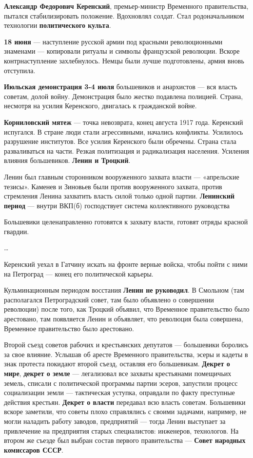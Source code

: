 \documentclass{article}
\begin{document}
\textbf{Александр Федорович Керенский}, премьер-министр Временного правительства, пытался стабилизировать положение. Вдохновлял солдат. Стал родоначальником технологии \textbf{политического культа}.

\textbf{18 июня} — наступление русской армии под красными революционными знаменами — копировали ритуалы и символы французской революции. Вскоре контрнаступление захлебнулось. Немцы были лучше подготовлены, армия вновь отступила.

\textbf{Июльская демонстрация 3-4 июля} большевиков и анархистов — вся власть советам, долой войну. Демонстрация было жестко подавлена полицией. Страна, несмотря на усилия Керенского, двигалась к гражданской войне.

\textbf{Корниловский мятеж} — точка невозврата, конец августа 1917 года. Керенский испугался. В стране люди стали агрессивными, начались конфликты. Усилилось разрушение институтов. Все усилия Керенского были обречены. Страна стала разваливаться на части. Резкая политизация и радикализация населения. Усиления влияния большевиков. \textbf{Ленин и Троцкий}.

Ленин был главным сторонником вооруженного захвата власти — «апрельские тезисы». Каменев и Зиновьев были против вооруженного захвата, против стремления Ленина захватить власть силой только одной партии. \textbf{Ленинский период} — внутри ВКП(б) господствует система коллективного руководства

Большевики целенаправленно готовятся к захвату власти, готовят отряды красной гвардии.

\hfill

\dots

Керенский уехал в Гатчину искать на фронте верные войска, чтобы пойти с ними на Петроград — конец его политической карьеры.

Кульминационным периодом восстания \textbf{Ленин не руководил}. В Смольном (там располагался Петроградский совет, там было объявлено о совершении революции) после того, как Троцкий объявил, что Временное правительство было арестовано, там появляется Ленин и объявляет, что революция была совершена, Временное правительство было арестовано.

Второй съезд советов рабочих и крестьянских депутатов — большевики боролись за свое влияние. Услышав об аресте Временного правительства, эсеры и кадеты в знак протеста покидают второй съезд, оставляя его большевикам. \textbf{Декрет о мире}, \textbf{декрет о земле} — легализовал все захваты крестьянами помещичьих земель, списали с политической программы партии эсеров, запустили процесс социализации земли — тактическая уступка, оправдали по факту преступные действия крестьян. \textbf{Декрет о власти} передавал всю власть советам. Большевики вскоре заметили, что советы плохо справлялись с своими задачами, например, не могли наладить работу заводов, предприятий — тогда Ленин выступает за привлечение на предприятия старых специалистов: инженеров, технологов. На втором же съезде был выбран состав первого правительства — \textbf{Совет народных комиссаров СССР}.
\end{document}
